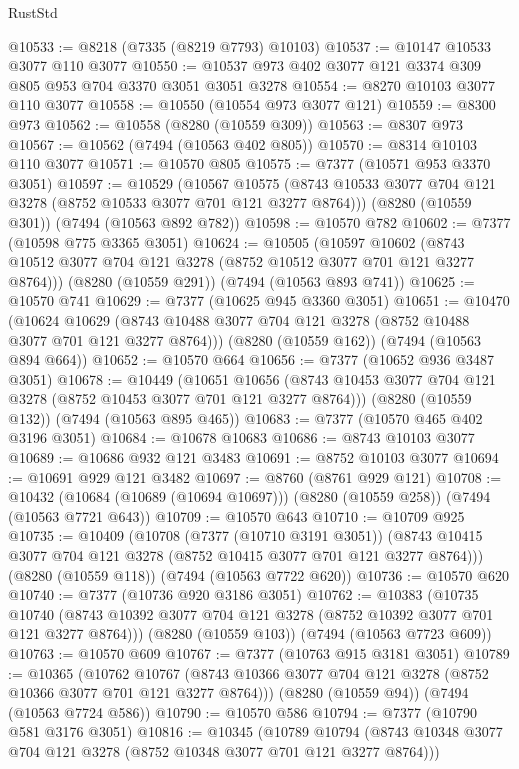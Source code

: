 \begin{lexlean}{RustStd}
\begin{coremodule}
@10533 := @8218 (@7335 (@8219 @7793) @10103)
@10537 := @10147 @10533 @3077 @110 @3077
@10550 := @10537 @973 @402 @3077 @121 @3374 @309 @805 @953 @704 @3370 @3051 @3051 @3278
@10554 := @8270 @10103 @3077 @110 @3077
@10558 := @10550 (@10554 @973 @3077 @121)
@10559 := @8300 @973
@10562 := @10558 (@8280 (@10559 @309))
@10563 := @8307 @973
@10567 := @10562 (@7494 (@10563 @402 @805))
@10570 := @8314 @10103 @110 @3077
@10571 := @10570 @805
@10575 := @7377 (@10571 @953 @3370 @3051)
@10597 := @10529
    (@10567 @10575 (@8743 @10533 @3077 @704 @121 @3278 (@8752 @10533 @3077 @701 @121 @3277 @8764)))
    (@8280 (@10559 @301))
    (@7494 (@10563 @892 @782))
@10598 := @10570 @782
@10602 := @7377 (@10598 @775 @3365 @3051)
@10624 := @10505
    (@10597 @10602 (@8743 @10512 @3077 @704 @121 @3278 (@8752 @10512 @3077 @701 @121 @3277 @8764)))
    (@8280 (@10559 @291))
    (@7494 (@10563 @893 @741))
@10625 := @10570 @741
@10629 := @7377 (@10625 @945 @3360 @3051)
@10651 := @10470
    (@10624 @10629 (@8743 @10488 @3077 @704 @121 @3278 (@8752 @10488 @3077 @701 @121 @3277 @8764)))
    (@8280 (@10559 @162))
    (@7494 (@10563 @894 @664))
@10652 := @10570 @664
@10656 := @7377 (@10652 @936 @3487 @3051)
@10678 := @10449
    (@10651 @10656 (@8743 @10453 @3077 @704 @121 @3278 (@8752 @10453 @3077 @701 @121 @3277 @8764)))
    (@8280 (@10559 @132))
    (@7494 (@10563 @895 @465))
@10683 := @7377 (@10570 @465 @402 @3196 @3051)
@10684 := @10678 @10683
@10686 := @8743 @10103 @3077
@10689 := @10686 @932 @121 @3483
@10691 := @8752 @10103 @3077
@10694 := @10691 @929 @121 @3482
@10697 := @8760 (@8761 @929 @121)
@10708 := @10432 (@10684 (@10689 (@10694 @10697))) (@8280 (@10559 @258)) (@7494 (@10563 @7721 @643))
@10709 := @10570 @643
@10710 := @10709 @925
@10735 := @10409
    (@10708
      (@7377 (@10710 @3191 @3051))
      (@8743 @10415 @3077 @704 @121 @3278 (@8752 @10415 @3077 @701 @121 @3277 @8764)))
    (@8280 (@10559 @118))
    (@7494 (@10563 @7722 @620))
@10736 := @10570 @620
@10740 := @7377 (@10736 @920 @3186 @3051)
@10762 := @10383
    (@10735 @10740 (@8743 @10392 @3077 @704 @121 @3278 (@8752 @10392 @3077 @701 @121 @3277 @8764)))
    (@8280 (@10559 @103))
    (@7494 (@10563 @7723 @609))
@10763 := @10570 @609
@10767 := @7377 (@10763 @915 @3181 @3051)
@10789 := @10365
    (@10762 @10767 (@8743 @10366 @3077 @704 @121 @3278 (@8752 @10366 @3077 @701 @121 @3277 @8764)))
    (@8280 (@10559 @94))
    (@7494 (@10563 @7724 @586))
@10790 := @10570 @586
@10794 := @7377 (@10790 @581 @3176 @3051)
@10816 := @10345
    (@10789 @10794 (@8743 @10348 @3077 @704 @121 @3278 (@8752 @10348 @3077 @701 @121 @3277 @8764)))

\end{coremodule}
\end{lexlean}
